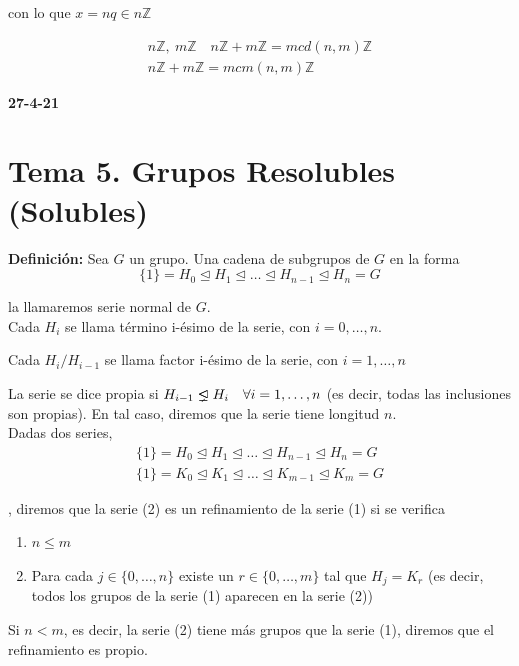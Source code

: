 \documentclass{article}
\newcommand{\unlhdneq}{%
  \mathrel{\ooalign{$\lneq$\cr\raise.22ex\hbox{$\lhd$}\cr}}}
\begin{document}
con lo que $x=nq \in n\mathbb{Z}$

\begin{gather*}
n\mathbb{Z},\:m\mathbb{Z}\quad n\mathbb{Z}+m\mathbb{Z}=mcd(n,m)\mathbb{Z} \\
n\mathbb{Z}+m\mathbb{Z}=mcm(n,m)\mathbb{Z}
\end{gather*}

\textbf{27-4-21} \\

\section{Tema 5. Grupos Resolubles (Solubles)}

\textbf{Definición:} Sea $G$ un grupo. Una cadena de subgrupos de $G$ en la forma
\begin{equation*}
\{1\}=H_0\unlhd H_1\unlhd \ldots \unlhd H_{n-1}\unlhd H_n=G
\end{equation*}

la llamaremos serie normal de $G$. \\

Cada $H_i$ se llama término i-ésimo de la serie, con $i=0,\ldots,n$.

Cada $H_i/H_{i-1}$ se llama factor i-ésimo de la serie, con $i=1,\ldots,n$

La serie se dice propia si $H_{i-1}\unlhdneq H_i\quad \forall i=1,\ldots,n$ (es decir, todas las inclusiones son propias). En tal caso, diremos que la serie tiene longitud $n$. \\

Dadas dos series,
\begin{gather*}
\{1\}=H_0\unlhd H_1\unlhd \ldots \unlhd H_{n-1}\unlhd H_n=G \tag{1} \\
\{1\}=K_0\unlhd K_1\unlhd \ldots \unlhd K_{m-1}\unlhd K_m=G \tag{2}
\end{gather*}

, diremos que la serie (2) es un refinamiento de la serie (1) si se verifica
\begin{enumerate}[\bfseries (i)]
\item $n\leq m$
\item Para cada $j\in \{0,\ldots,n\}$ existe un $r\in \{0,\ldots,m\}$ tal que $H_j=K_r$ (es decir, todos los grupos de la serie (1) aparecen en la serie (2))
\end{enumerate}

Si $n<m$, es decir, la serie (2) tiene más grupos que la serie (1), diremos que el refinamiento es propio. \\
\end{document}
